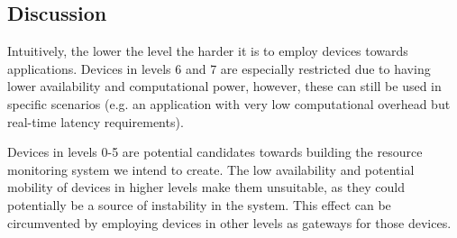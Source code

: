 \subsection{Discussion}

Intuitively, the lower the level the harder it is to employ devices towards applications. Devices in levels 6 and 7 are especially restricted due to having lower availability and computational power, however, these can still be used in specific scenarios (e.g. an application with very low computational overhead but real-time latency requirements). 

Devices in levels 0-5 are potential candidates towards building the resource monitoring system we intend to create. The low availability and potential mobility of devices in higher levels make them unsuitable, as they could potentially be a source of instability in the system. This effect can be circumvented by employing devices in other levels as gateways for those devices.